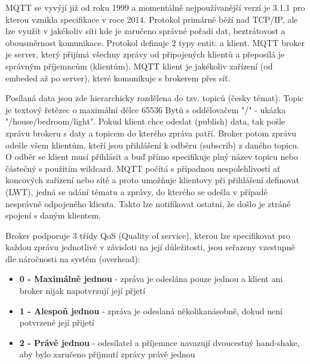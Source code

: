\documentclass[thesis=B,czech]{FITthesis}[2019/12/23]
\begin{document}
MQTT se vyvýjí již od roku 1999 a momentálně nejpoužívanější verzí je 3.1.1 pro kterou vznikla specifikace v roce 2014. Protokol primárně běží nad TCP/IP, ale lze využít v jakékoliv síti kde je zaručeno správné pořadí dat, beztrátovost a obousměrnost komunikace. Protokol definuje 2 typy entit:  a klient. MQTT broker je server, který přijímá všechny zprávy od připojených klientů a přeposílá je správným příjemncům (klientům). MQTT klient je jakékoliv zařízení (od embeded až po server), které komunikuje s brokerem přes síť.

Posílaná data jsou zde hierarchicky rozdělena do tzv. topiců (česky témat). Topic je textový řetězec o maximální délce 65536 Bytů s oddělovačem "/" - ukázka "/house/bedroom/light". Pokud klient chce odeslat (publish) data, tak pošle zprávu brokeru s daty a topicem do kterého zpráva patří. Broker potom zprávu odešle všem klientům, kteří jsou přihlášení k odběru (subscrib) z daného topicu. O odběr se klient musí přihlásit a buď přímo specifikuje plný název topicu nebo částečný s použitím wildcard. MQTT počítá s případnou nespolehlivostí ať koncových zařízení nebo sítě a proto umožňuje klientovy při přihlášení definovat  (LWT), jedná se udání tématu a zprávy, do kterého se odešla v případě nesprávně odpojeného klienta. Takto lze notifikovat ostatní, že došlo je ztráně spojení s daným klientem.

Broker podporuje 3 třídy QoS (Quality of service), kterou lze specifikovat pro každou zprávu jednotlivě v závisloti na její důležitosti, jsou seřazeny vzestupně dle náročnosti na systém (overhead):
\begin{itemize}
    \item \textbf{0 - Maximálně jednou} - zpráva je odeslána pouze jednou a klient ani broker nijak napotvrzují její přjetí
    \item \textbf{1 - Alespoň jednou} - zpráva je odeslaná několikanásobně, dokud není potvrzené její přijetí
    \item \textbf{2 - Právě jednou} - odesílatel a příjemnce navazují dvoucestný hand-shake, aby bylo zaručeno přijmutí zprávy právě jednou
\end{itemize}
\end{document}
